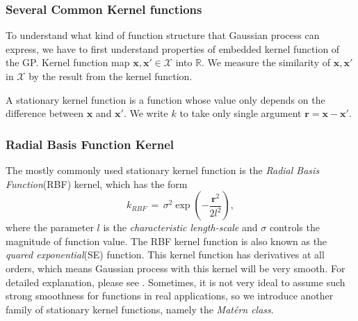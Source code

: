 \documentclass[11pt,a4paper]{article}
\theoremstyle{definition}
\newcommand{\RR}{\mathbb{R}}
\numberwithin{equation}{section}
\let\vec\mathbf
\begin{document}
	\subsubsection{Several Common Kernel functions}
	To understand what kind of function structure that Gaussian process can express, we have to first understand properties of embedded kernel function of the GP.
	Kernel function map $\vec x,\vec x' \in \mathcal X$ into $\RR$. We measure the similarity of $\vec x,\vec x'$ in $\mathcal X$ by the result from the kernel function.
	
	A stationary kernel function is a function whose value only depends on the difference between $\vec x$ and $\vec x'$. We write $k$ to take only single argument $\vec r = \vec x - \vec x'$. 
	\subsubsection*{Radial Basis Function Kernel}
	The mostly commonly used stationary kernel function is the \textit{Radial Basis Function}(RBF) kernel, which has the form
	\begin{equation}\label{RBF}
	k_{RBF}\, = \, \sigma^2\exp\left(-\frac{\vec r^2}{2l^2}\right),
	\end{equation}
	where the parameter $l$ is the \textit{characteristic length-scale} and $\sigma$ controls the magnitude of function value. The RBF kernel function is also known as the \textit{quared exponential}(SE) function. This kernel function has derivatives at all orders, which means Gaussian process with this kernel will be very smooth. For detailed explanation, please see \cite[Rasmussen and Williams, sec 4.2]{RandW}. Sometimes, it is not very ideal to assume such strong smoothness for functions in real applications, so we introduce another family of stationary kernel functions, namely the \textit{Mat\'ern class}\cite[Stein]{Stein}.
	
\end{document}
